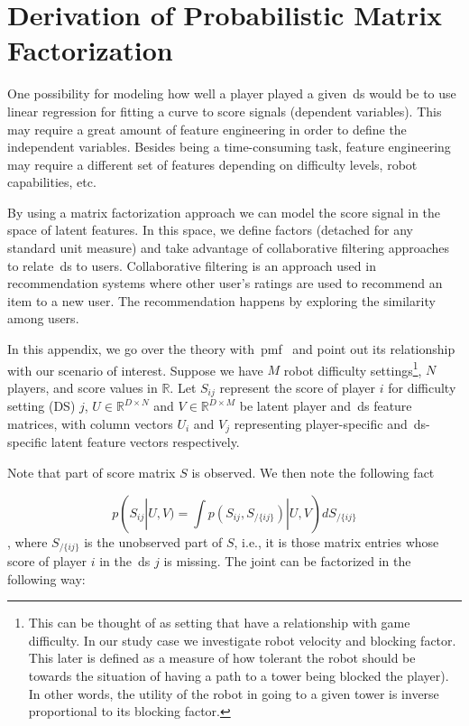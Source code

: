 \chapter{Derivation of Probabilistic Matrix Factorization}\label{app:pmf}
\small
One possibility for modeling how well a player played a given~\gls{ds} would be to use linear regression for fitting a curve to score signals (dependent variables). This may require a great amount of feature engineering in order to define the independent variables. Besides being a time-consuming task, feature engineering may require a different set of features depending on difficulty levels, robot capabilities, etc. 

By using a matrix factorization approach we can model the score signal in the space of latent features. In this space, we define factors (detached for any standard unit measure) and take advantage of collaborative filtering approaches to relate~\gls{ds} to users. Collaborative filtering is an approach used in recommendation systems where other user's ratings are used to recommend an item to a new user. The recommendation happens by exploring the similarity among users.

In this appendix, we go over the theory with~\gls{pmf}~\citep{mnih_probabilistic_2008} and point out its relationship with our scenario of interest. Suppose we have $M$ robot difficulty settings\footnote{This can be thought of as setting that have a relationship with game difficulty. In our study case we investigate robot velocity and blocking factor. This later is defined as a measure of how tolerant the robot should be towards the situation of having a path to a tower being blocked the player). In other words, the utility of the robot in going to a given tower is inverse proportional to its blocking factor.}, $N$
players, and score values in $\mathbb{R}$. Let $S_{ij}$ represent the score of player $i$ for difficulty setting (DS) $j$, $U \in \mathbb{R}^{D\times N}$ and $V \in \mathbb{R}^{D\times M}$ be latent player and~\gls{ds} feature matrices, with column vectors $U_i$ and $V_j$ representing player-specific and~\gls{ds}-specific latent feature vectors respectively.  

Note that part of score matrix $S$ is observed. We then note the following fact

\begin{equation}
p(S_{ij} | U, V) = \int p(S_{ij}, S_{/\{ij\}} ) | U, V)dS_{/\{ij\}}
\end{equation}
, where $S_{/\{ij\}}$ is the unobserved part of $S$, i.e., it is those matrix entries whose score of player $i$ in the~\gls{ds} $j$ is missing. The joint can be factorized in the following way:

